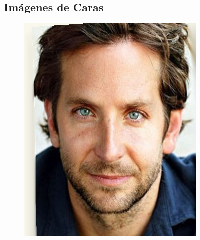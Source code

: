 \documentclass[conference]{IEEEtran}
\begin{document}
	\subsection*{Imágenes de Caras}
\begin{figure}[H]
\begin{multicols}{3}
    \centering
    \includegraphics[width=1.0\linewidth]{results/faces/G/img01.png} \par

\end{multicols}
\end{figure}
\end{document}
